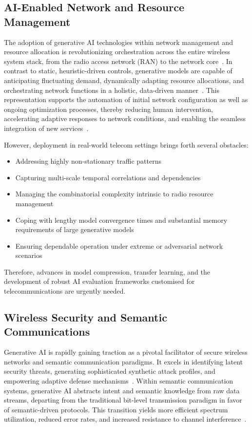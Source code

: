 \documentclass[sigconf]{acmart}
\begin{document}
\subsection{AI-Enabled Network and Resource Management}

The adoption of generative AI technologies within network management and resource allocation is revolutionizing orchestration across the entire wireless system stack, from the radio access network (RAN) to the network core~\cite{ref44}. In contrast to static, heuristic-driven controls, generative models are capable of anticipating fluctuating demand, dynamically adapting resource allocations, and orchestrating network functions in a holistic, data-driven manner~\cite{ref44,ref46}. This representation supports the automation of initial network configuration as well as ongoing optimization processes, thereby reducing human intervention, accelerating adaptive responses to network conditions, and enabling the seamless integration of new services~\cite{ref46}.

However, deployment in real-world telecom settings brings forth several obstacles:
\begin{itemize}
    \item Addressing highly non-stationary traffic patterns
    \item Capturing multi-scale temporal correlations and dependencies
    \item Managing the combinatorial complexity intrinsic to radio resource management
    \item Coping with lengthy model convergence times and substantial memory requirements of large generative models
    \item Ensuring dependable operation under extreme or adversarial network scenarios
\end{itemize}
Therefore, advances in model compression, transfer learning, and the development of robust AI evaluation frameworks customised for telecommunications are urgently needed.

\subsection{Wireless Security and Semantic Communications}

Generative AI is rapidly gaining traction as a pivotal facilitator of secure wireless networks and semantic communication paradigms. It excels in identifying latent security threats, generating sophisticated synthetic attack profiles, and empowering adaptive defense mechanisms~\cite{ref15,ref26,ref44}. Within semantic communication systems, generative AI abstracts intent and semantic knowledge from raw data streams, departing from the traditional bit-level transmission paradigm in favor of semantic-driven protocols. This transition yields more efficient spectrum utilization, reduced error rates, and increased resistance to channel interference~\cite{ref15,ref26,ref44}.
\end{document}
